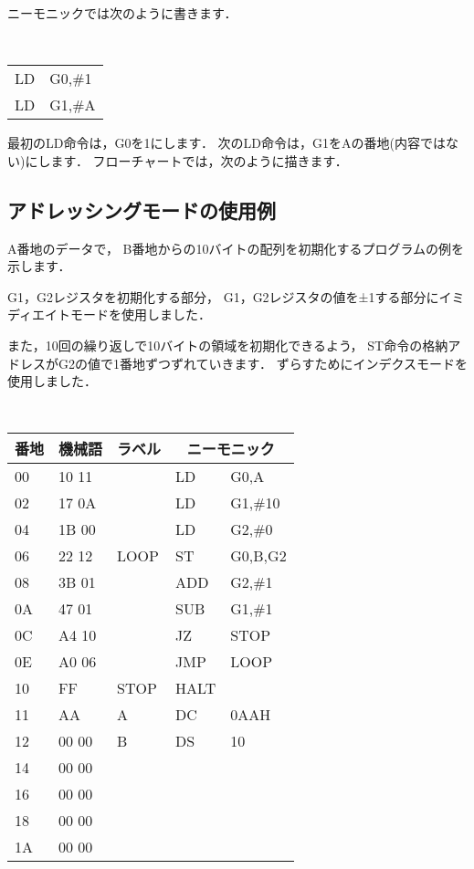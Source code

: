 ニーモニックでは次のように書きます．
\begin{center}
{\tt
\begin{tabular}{l l}
LD & G0,\#1       \\
LD & G1,\#A       \\
\end{tabular}
}
\end{center}
最初のLD命令は，G0を1にします．
次のLD命令は，G1をAの番地(内容ではない)にします．
フローチャートでは，次のように描きます．

\begin{center}
\epsfxsize=3cm
\end{center}

\subsection{アドレッシングモードの使用例}
A番地のデータで，
B番地からの10バイトの配列を初期化するプログラムの例を示します．

G1，G2レジスタを初期化する部分，
G1，G2レジスタの値を±1する部分にイミディエイトモードを使用しました．

また，10回の繰り返しで10バイトの領域を初期化できるよう，
ST命令の格納アドレスがG2の値で1番地ずつずれていきます．
ずらすためにインデクスモードを使用しました．
\begin{center}
{\small\tt
\begin{tabular}{|l|l|l|l l|} \hline
番地 & 機械語 & ラベル & \multicolumn{2}{|c|}{ニーモニック} \\
\hline
00 & 10 11 &      & LD   & G0,A          \\
02 & 17 0A &      & LD   & G1,\#10       \\
04 & 1B 00 &      & LD   & G2,\#0        \\
06 & 22 12 & LOOP & ST   & G0,B,G2       \\
08 & 3B 01 &      & ADD  & G2,\#1        \\
0A & 47 01 &      & SUB  & G1,\#1        \\
0C & A4 10 &      & JZ   & STOP          \\
0E & A0 06 &      & JMP  & LOOP          \\
10 & FF    & STOP & HALT &               \\
11 & AA    & A    & DC   & 0AAH          \\
12 & 00 00 & B    & DS   & 10            \\
14 & 00 00 &      &      &               \\
16 & 00 00 &      &      &               \\
18 & 00 00 &      &      &               \\
1A & 00 00 &      &      &               \\
\hline
\end{tabular}
}
\end{center}

